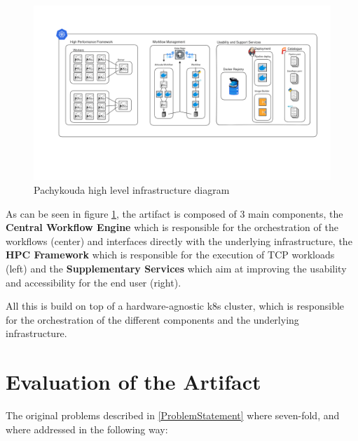 \begin{figure}[htb]
    \centering
    \includegraphics[width=16cm]{graphics/pachykouda_three_aspects.png}
    \caption[Pachykouda high level diagram showing three main aspects]{Pachykouda high level infrastructure diagram}
    \label{abb:pachykouda_three_aspects}
\end{figure}


As can be seen in figure \ref{abb:pachykouda_three_aspects}, the artifact is composed of 3 main components, 
the \textbf{Central Workflow Engine} which is responsible for the orchestration of the workflows (center) and interfaces directly with the underlying infrastructure,
the \textbf{\ac{HPC} Framework} which is responsible for the execution of \ac{TCP} workloads (left)
and the \textbf{Supplementary Services} which aim at improving the usability and accessibility for the end user (right).

All this is build on top of a hardware-agnostic \ac{k8s} cluster, which is responsible for the orchestration of the different components and the underlying infrastructure.







\section{Evaluation of the Artifact}


The original problems described in \ref{ProblemStatement} where seven-fold, and where addressed in the following way:

